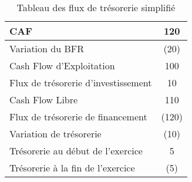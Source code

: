 \begin{table}[h]
\renewcommand{\arraystretch}{1.2}
\footnotesize
\centering
\begin{tabular}{|l|c|}
\hline                                                                                                                                                                
  CAF    & 120 \\
\hline                                                                                                                                                              
  Variation du BFR  & (20) \\
\hline                                                                                                                                                              
  Cash Flow d'Exploitation & 100 \\
\hline  
  Flux de trésorerie d'investissement & 10 \\
\hline     
Cash Flow Libre & 110 \\                                                                                                                                                                                                                                                                                              
\hline                                                                                                                                                                
Flux de trésorerie de financement & (120) \\
\hline     
Variation de trésorerie & (10) \\                                                                                                                                                                                                                                                                                              
\hline  
Trésorerie au début de l'exercice & 5 \\                                                                                                                                                                                                                                                                                              
\hline  
Trésorerie à la fin de l'exercice & (5) \\                                                                                                                                                                                                                                                                                              
\hline  
\end{tabular}
\label{tftex1}
\caption{Tableau des flux de trésorerie simplifié}
\end{table}


